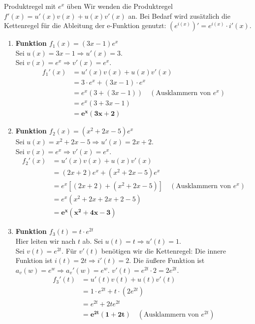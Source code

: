 \begin{loesungsumgebung}{Produktregel mit $e^x$ üben}
Wir wenden die Produktregel $f'(x) = u'(x)v(x) + u(x)v'(x)$ an. Bei Bedarf wird zusätzlich die Kettenregel für die Ableitung der e-Funktion genutzt: $(e^{i(x)})' = e^{i(x)} \cdot i'(x)$.

\begin{enumerate}[label=(\alph*)]
    \item \textbf{Funktion $f_1(x) = (3x-1)e^x$} \\
    Sei $u(x) = 3x-1 \Rightarrow u'(x) = 3$. \\
    Sei $v(x) = e^x \Rightarrow v'(x) = e^x$.
    \begin{align*}
    f_1'(x) &= u'(x)v(x) + u(x)v'(x) \\
            &= 3 \cdot e^x + (3x-1) \cdot e^x \\
            &= e^x (3 + (3x-1)) \quad (\text{Ausklammern von } e^x) \\
            &= e^x (3 + 3x - 1) \\
            &= \mathbf{e^x (3x + 2)}
    \end{align*}

    \item \textbf{Funktion $f_2(x) = (x^2+2x-5)e^x$} \\
    Sei $u(x) = x^2+2x-5 \Rightarrow u'(x) = 2x+2$. \\
    Sei $v(x) = e^x \Rightarrow v'(x) = e^x$.
    \begin{align*}
    f_2'(x) &= u'(x)v(x) + u(x)v'(x) \\
            &= (2x+2)e^x + (x^2+2x-5)e^x \\
            &= e^x [(2x+2) + (x^2+2x-5)] \quad (\text{Ausklammern von } e^x) \\
            &= e^x (x^2 + 2x + 2x + 2 - 5) \\
            &= \mathbf{e^x (x^2 + 4x - 3)}
    \end{align*}

    \item \textbf{Funktion $f_3(t) = t \cdot e^{2t}$} \\
    Hier leiten wir nach $t$ ab.
    Sei $u(t) = t \Rightarrow u'(t) = 1$. \\
    Sei $v(t) = e^{2t}$. Für $v'(t)$ benötigen wir die Kettenregel:
    Die innere Funktion ist $i(t)=2t \Rightarrow i'(t)=2$. Die äußere Funktion ist $a_v(w)=e^w \Rightarrow a_v'(w)=e^w$.
    $v'(t) = e^{2t} \cdot 2 = 2e^{2t}$.
    \begin{align*}
    f_3'(t) &= u'(t)v(t) + u(t)v'(t) \\
             &= 1 \cdot e^{2t} + t \cdot (2e^{2t}) \\
             &= e^{2t} + 2te^{2t} \\
             &= \mathbf{e^{2t} (1 + 2t)} \quad (\text{Ausklammern von } e^{2t})
    \end{align*}
\end{enumerate}

\end{loesungsumgebung}

